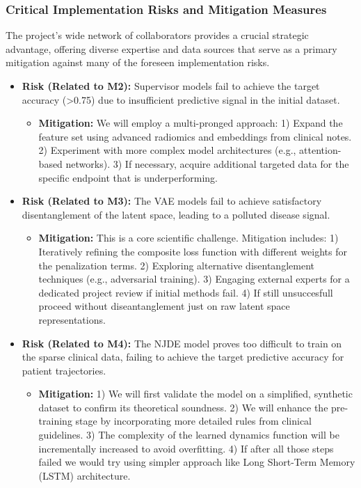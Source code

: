 \documentclass[11pt, a4paper]{article}
\begin{document}
\subsubsection*{Critical Implementation Risks and Mitigation Measures}
The project's wide network of collaborators provides a crucial strategic advantage, offering diverse expertise and data sources that serve as a primary mitigation against many of the foreseen implementation risks.
\begin{itemize}
    \item \textbf{Risk (Related to M2):} Supervisor models fail to achieve the target accuracy (>0.75) due to insufficient predictive signal in the initial dataset.
    \begin{itemize}
        \item \textbf{Mitigation:} We will employ a multi-pronged approach: 1) Expand the feature set using advanced radiomics and embeddings from clinical notes. 2) Experiment with more complex model architectures (e.g., attention-based networks). 3) If necessary, acquire additional targeted data for the specific endpoint that is underperforming.
    \end{itemize}
    \item \textbf{Risk (Related to M3):} The VAE models fail to achieve satisfactory disentanglement of the latent space, leading to a polluted disease signal.
    \begin{itemize}
        \item \textbf{Mitigation:} This is a core scientific challenge. Mitigation includes: 1) Iteratively refining the composite loss function with different weights for the penalization terms. 2) Exploring alternative disentanglement techniques (e.g., adversarial training). 3) Engaging external experts for a dedicated project review if initial methods fail. 4) If still unsuccesfull proceed without diseantanglement just on raw latent space representations.
    \end{itemize}
    \item \textbf{Risk (Related to M4):} The NJDE model proves too difficult to train on the sparse clinical data, failing to achieve the target predictive accuracy for patient trajectories.
    \begin{itemize}
        \item \textbf{Mitigation:} 1) We will first validate the model on a simplified, synthetic dataset to confirm its theoretical soundness. 2) We will enhance the pre-training stage by incorporating more detailed rules from clinical guidelines. 3) The complexity of the learned dynamics function will be incrementally increased to avoid overfitting. 4) If after all those steps failed we would try using simpler approach like Long Short-Term Memory (LSTM) architecture. 

\end{itemize}
\end{itemize}
\end{document}
